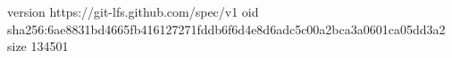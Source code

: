 version https://git-lfs.github.com/spec/v1
oid sha256:6ae8831bd4665fb416127271fddb6f6d4e8d6adc5c00a2bca3a0601ca05dd3a2
size 134501
